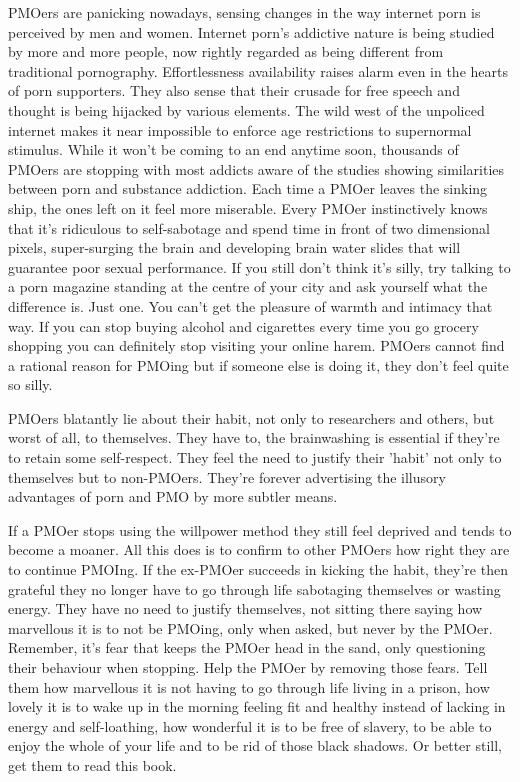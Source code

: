 \documentclass[easypeasy.tex]{subfiles}
\begin{document}
PMOers are panicking nowadays, sensing changes in the way internet porn is perceived by men and women. Internet porn's addictive nature is being studied by more and more people, now rightly regarded as being different from traditional pornography. Effortlessness availability raises alarm even in the hearts of porn supporters. They also sense that their crusade for free speech and thought is being hijacked by various elements. The wild west of the unpoliced internet makes it near impossible to enforce age restrictions to supernormal stimulus. While it won't be coming to an end anytime soon, thousands of PMOers are stopping with most addicts aware of the studies showing similarities between porn and substance addiction. Each time a PMOer leaves the sinking ship, the ones left on it feel more miserable. Every PMOer instinctively knows that it's ridiculous to self-sabotage and spend time in front of two dimensional pixels, super-surging the brain and developing brain water slides that will guarantee poor sexual performance. If you still don't think it's silly, try talking to a porn magazine standing at the centre of your city and ask yourself what the difference is. Just one. You can't get the pleasure of warmth and intimacy that way. If you can stop buying alcohol and cigarettes every time you go grocery shopping you can definitely stop visiting your online harem. PMOers cannot find a rational reason for PMOing but if someone else is doing it, they don't feel quite so silly.

PMOers blatantly lie about their habit, not only to researchers and others, but worst of all, to themselves. They have to, the brainwashing is essential if they're to retain some self-respect. They feel the need to justify their 'habit' not only to themselves but to non-PMOers. They're forever advertising the illusory advantages of porn and PMO by more subtler means.

If a PMOer stops using the willpower method they still feel deprived and tends to become a moaner. All this does is to confirm to other PMOers how right they are to continue PMOIng. If the ex-PMOer succeeds in kicking the habit, they're then grateful they no longer have to go through life sabotaging themselves or wasting energy. They have no need to justify themselves, not sitting there saying how marvellous it is to not be PMOing, only when asked, but never by the PMOer. Remember, it's fear that keeps the PMOer head in the sand, only questioning their behaviour when stopping. Help the PMOer by removing those fears. Tell them how marvellous it is not having to go through life living in a prison, how lovely it is to wake up in the morning feeling fit and healthy instead of lacking in energy and self-loathing, how wonderful it is to be free of slavery, to be able to enjoy the whole of your life and to be rid of those black shadows. Or better still, get them to read this book.
\end{document}
